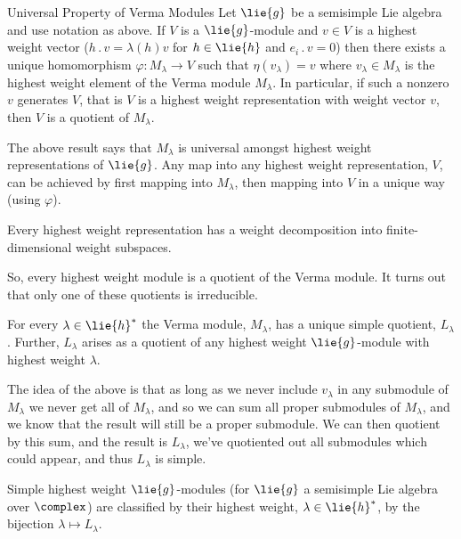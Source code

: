 \documentclass[fleqn]{NotesClass}
\newcommand{\action}{\mathbin{.}}
\begin{document}
    \begin{prp}{Universal Property of Verma Modules}{}
        Let \(\lie{g}\) be a semisimple Lie algebra and use notation as above.
        If \(V\) is a \(\lie{g}\)-module and \(v \in V\) is a highest weight vector (\(h \action v = \lambda(h)v\) for \(h \in \lie{h}\) and \(e_i \action v = 0\)) then there exists a unique homomorphism \(\varphi \colon M_\lambda \to V\) such that \(\eta(v_\lambda) = v\) where \(v_\lambda \in M_\lambda\) is the highest weight element of the Verma module \(M_\lambda\).
        In particular, if such a nonzero \(v\) generates \(V\), that is \(V\) is a highest weight representation with weight vector \(v\), then \(V\) is a quotient of \(M_\lambda\).
    \end{prp}
    
    The above result says that \(M_\lambda\) is universal amongst highest weight representations of \(\lie{g}\).
    Any map into any highest weight representation, \(V\), can be achieved by first mapping into \(M_\lambda\), then mapping into \(V\) in a unique way (using \(\varphi\)).
    
    \begin{prp}{}{}
        Every highest weight representation has a weight decomposition into finite-dimensional weight subspaces.
    \end{prp}
    
    So, every highest weight module is a quotient of the Verma module.
    It turns out that only one of these quotients is irreducible.
    
    \begin{prp}{}{}
        For every \(\lambda \in \lie{h}^*\) the Verma module, \(M_\lambda\), has a unique simple quotient, \(L_\lambda\).
        Further, \(L_\lambda\) arises as a quotient of any highest weight \(\lie{g}\)-module with highest weight \(\lambda\).
    \end{prp}
    
    The idea of the above is that as long as we never include \(v_\lambda\) in any submodule of \(M_\lambda\) we never get all of \(M_\lambda\), and so we can sum all proper submodules of \(M_\lambda\), and we know that the result will still be a proper submodule.
    We can then quotient by this sum, and the result is \(L_\lambda\), we've quotiented out all submodules which could appear, and thus \(L_\lambda\) is simple.
    
    \begin{crl}{}{}
        Simple highest weight \(\lie{g}\)-modules (for \(\lie{g}\) a semisimple Lie algebra over \(\complex\)) are classified by their highest weight, \(\lambda \in \lie{h}^*\), by the bijection \(\lambda \mapsto L_\lambda\).
    \end{crl}
    
\end{document}
